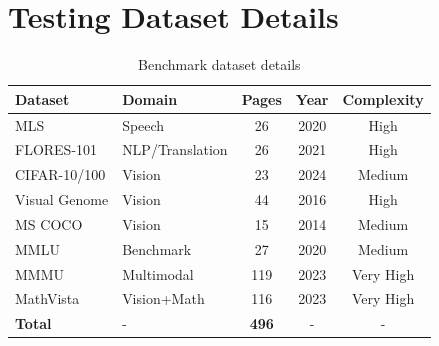 \documentclass[11pt,a4paper]{article}
\begin{document}
\section{Testing Dataset Details}

\begin{table}[h]
\centering
\begin{tabular}{llccc}
\toprule
\textbf{Dataset} & \textbf{Domain} & \textbf{Pages} & \textbf{Year} & \textbf{Complexity} \\
\midrule
MLS & Speech & 26 & 2020 & High \\
FLORES-101 & NLP/Translation & 26 & 2021 & High \\
CIFAR-10/100 & Vision & 23 & 2024 & Medium \\
Visual Genome & Vision & 44 & 2016 & High \\
MS COCO & Vision & 15 & 2014 & Medium \\
MMLU & Benchmark & 27 & 2020 & Medium \\
MMMU & Multimodal & 119 & 2023 & Very High \\
MathVista & Vision+Math & 116 & 2023 & Very High \\
\midrule
\textbf{Total} & - & \textbf{496} & - & - \\
\bottomrule
\end{tabular}
\caption{Benchmark dataset details}
\end{table}
\end{document}

